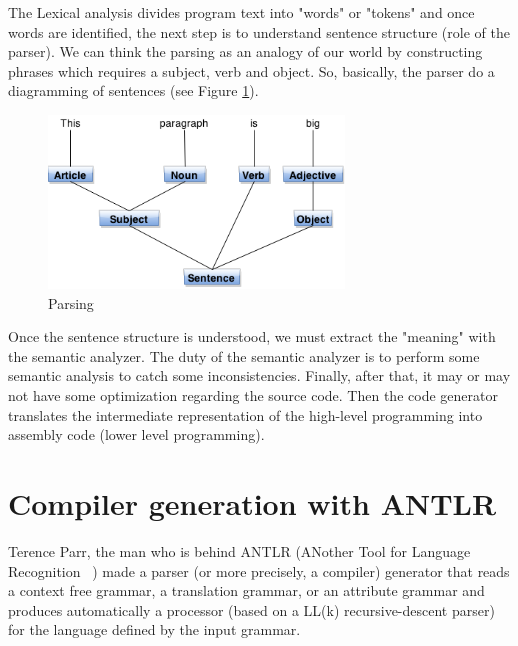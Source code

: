 \documentclass[
  oneside,
  11pt, a4paper,
  footinclude=true,
  headinclude=true,
  cleardoublepage=empty
]{scrbook}
\begin{document}
The Lexical analysis divides program text into "words" or "tokens" and once words are identified, the next step is to understand sentence structure (role of the parser).
We can think the parsing as an analogy of our world by constructing phrases which requires a subject, verb and object. So, basically, the parser do a diagramming of sentences (see Figure \ref{fig:parsing}).
\begin{figure}
\begin{center}
       \includegraphics[width=0.7\textwidth]{img/parsing.png}
\end{center}
\caption{Parsing}
\label{fig:parsing}
\end{figure}
Once the sentence structure is understood, we must extract the "meaning" with the semantic analyzer.
The duty of the semantic analyzer is to perform some semantic analysis to catch some inconsistencies.
Finally, after that, it may or may not have some optimization regarding the source code. Then the code generator translates the intermediate representation of the high-level programming into assembly code (lower level programming).
\newpage

\section{Compiler generation with ANTLR}

Terence Parr, the man who is behind ANTLR (ANother Tool for Language Recognition ~\citep{parr2007,Par05}) made a parser (or more precisely, a compiler) generator that reads a context free grammar, a translation grammar, or an attribute grammar and produces automatically a processor (based on a LL(k) recursive-descent parser) for the language defined by the input grammar.
\end{document}

